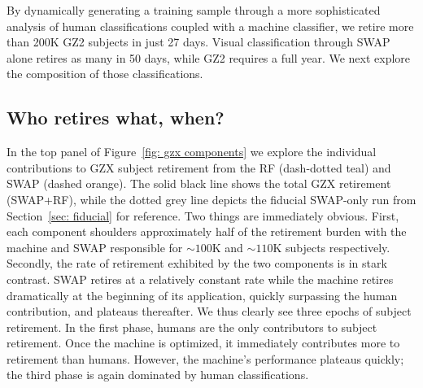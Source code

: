 \documentclass[twocolumn]{aastex6}%
\begin{document}
By dynamically generating a training sample through a more sophisticated analysis of 
human classifications coupled with a machine classifier, we retire more than 200K 
GZ2 subjects in just 27 days.  Visual classification through SWAP alone retires as 
many in 50 days, while GZ2 requires a full year.  
We next explore the composition of those classifications.



\subsection{Who retires what, when?}  

In the top panel of Figure~\ref{fig: gzx components} we explore the individual 
contributions to GZX subject retirement from the RF (dash-dotted teal) 
and SWAP (dashed orange). The solid black line shows the total GZX retirement (SWAP+RF), while the dotted grey line depicts the fiducial SWAP-only run from 
Section~\ref{sec: fiducial} for reference. 
Two things are immediately obvious. First, each component shoulders approximately
half of the retirement burden with the machine and SWAP responsible for 
$\sim$$100$K and $\sim$$110$K subjects respectively.  
Secondly, the rate of retirement exhibited by the two components is in stark contrast.
SWAP retires at a relatively constant rate while the machine retires 
dramatically at the beginning of its application, quickly surpassing the human 
contribution, and plateaus thereafter. 
We thus clearly see three epochs of subject retirement.
In the first phase, humans are the only contributors to subject retirement.  
Once the machine is optimized, it immediately contributes more to retirement than humans.
However, the machine's performance plateaus quickly;  the third 
phase is again dominated by human classifications.
\end{document}
